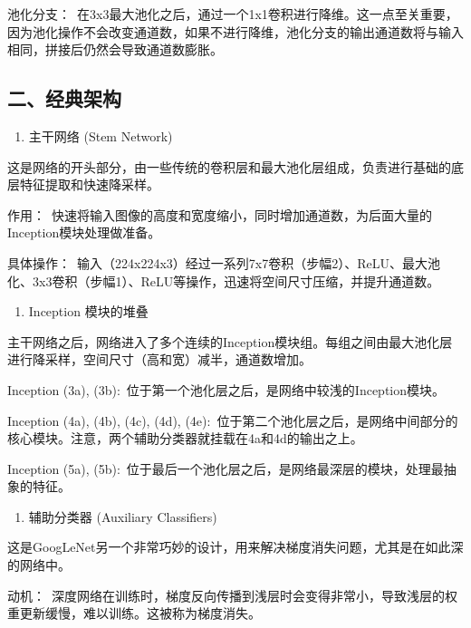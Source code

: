 池化分支：~在3x3最大池化之后，通过一个1x1卷积进行降维。这一点至关重要，因为池化操作不会改变通道数，如果不进行降维，池化分支的输出通道数将与输入相同，拼接后仍然会导致通道数膨胀。

\hypertarget{ux4e8cux7ecfux5178ux67b6ux6784}{%
\subsection{二、经典架构}\label{ux4e8cux7ecfux5178ux67b6ux6784}}

\begin{enumerate}
\def\labelenumi{\arabic{enumi}.}
\tightlist
\item
  主干网络 (Stem Network)
\end{enumerate}

这是网络的开头部分，由一些传统的卷积层和最大池化层组成，负责进行基础的底层特征提取和快速降采样。

作用：~快速将输入图像的高度和宽度缩小，同时增加通道数，为后面大量的Inception模块处理做准备。

具体操作：~输入（224x224x3）经过一系列7x7卷积（步幅2）、ReLU、最大池化、3x3卷积（步幅1）、ReLU等操作，迅速将空间尺寸压缩，并提升通道数。

\begin{enumerate}
\def\labelenumi{\arabic{enumi}.}
\setcounter{enumi}{1}
\tightlist
\item
  Inception 模块的堆叠
\end{enumerate}

主干网络之后，网络进入了多个连续的Inception模块组。每组之间由最大池化层进行降采样，空间尺寸（高和宽）减半，通道数增加。

Inception (3a), (3b):~位于第一个池化层之后，是网络中较浅的Inception模块。

Inception (4a), (4b), (4c), (4d), (4e):~位于第二个池化层之后，是网络中间部分的核心模块。注意，两个辅助分类器就挂载在4a和4d的输出之上。

Inception (5a), (5b):~位于最后一个池化层之后，是网络最深层的模块，处理最抽象的特征。

\begin{enumerate}
\def\labelenumi{\arabic{enumi}.}
\setcounter{enumi}{2}
\tightlist
\item
  辅助分类器 (Auxiliary Classifiers)
\end{enumerate}

这是GoogLeNet另一个非常巧妙的设计，用来解决梯度消失问题，尤其是在如此深的网络中。

动机：~深度网络在训练时，梯度反向传播到浅层时会变得非常小，导致浅层的权重更新缓慢，难以训练。这被称为梯度消失。

